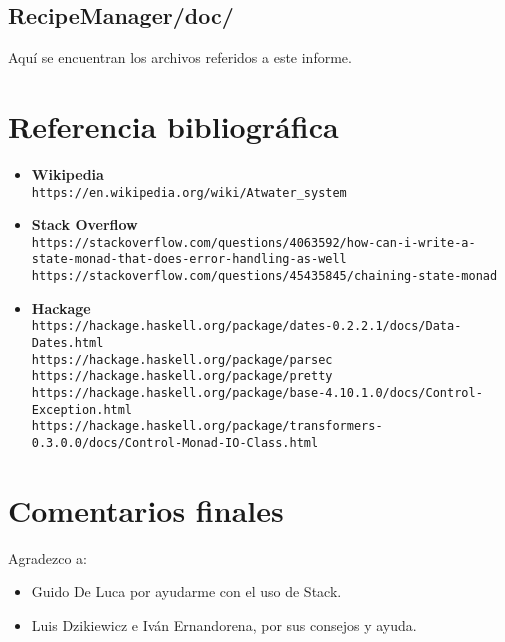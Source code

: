 \documentclass[a4paper]{article}
\begin{document}
\subsection*{RecipeManager/doc/}
Aquí se encuentran los archivos referidos a este informe.


\section*{Referencia bibliográfica}
\begin{itemize}

\item \textbf{Wikipedia}\\
      \texttt{https://en.wikipedia.org/wiki/Atwater\_system}\\
      
\item \textbf{Stack Overflow}\\
      \texttt{https://stackoverflow.com/questions/4063592/how-can-i-write-a-state-monad-that-does-error-handling-as-well}\\
      \texttt{https://stackoverflow.com/questions/45435845/chaining-state-monad}\\
\item \textbf{Hackage}\\
     \texttt{https://hackage.haskell.org/package/dates-0.2.2.1/docs/Data-Dates.html}\\
     \texttt{https://hackage.haskell.org/package/parsec}\\
     \texttt{https://hackage.haskell.org/package/pretty}\\
     \texttt{https://hackage.haskell.org/package/base-4.10.1.0/docs/Control-Exception.html}\\
     \texttt{https://hackage.haskell.org/package/transformers-0.3.0.0/docs/Control-Monad-IO-Class.html}\\
\end{itemize}

\section*{Comentarios finales}
Agradezco a:
\begin{itemize}
\item{Guido De Luca} por ayudarme con el uso de Stack.
\item{Luis Dzikiewicz e Iván Ernandorena}, por sus consejos y ayuda.
\end{itemize}
\end{document}
